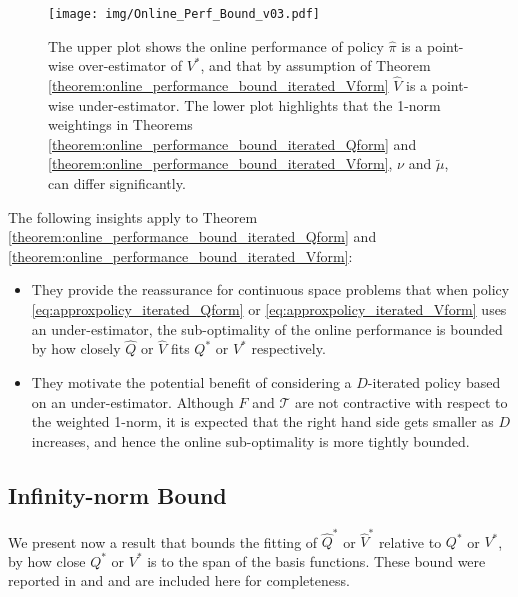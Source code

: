 \documentclass[journal]{IEEEtran}
\newcommand{\mcal}{\mathcal}
\begin{document}
\begin{figure}[t]
	\centering
	\texttt{[image: img/Online\_Perf\_Bound\_v03.pdf]}
	\caption[Visualizing the components of the online performance bound]
	{
		The upper plot shows the online performance of policy $\hat{\pi}$ is a point-wise over-estimator of $V^\ast$, and that by assumption of Theorem \ref{theorem:online_performance_bound_iterated_Vform} $\hat{V}$ is a point-wise under-estimator. The lower plot highlights that the 1-norm weightings in Theorems \ref{theorem:online_performance_bound_iterated_Qform} and \ref{theorem:online_performance_bound_iterated_Vform}, $\nu$ and $\tilde{\mu}$, can differ significantly.
	}
	\label{fig:online_bound_visualisation}
\end{figure}


The following insights apply to Theorem \ref{theorem:online_performance_bound_iterated_Qform} and \ref{theorem:online_performance_bound_iterated_Vform}:
\begin{itemize}
	\item They provide the reassurance for continuous space problems that when policy \eqref{eq:approxpolicy_iterated_Qform} or \eqref{eq:approxpolicy_iterated_Vform} uses an under-estimator, the sub-optimality of the online performance is bounded by how closely $\hat{Q}$ or $\hat{V}$ fits $Q^\ast$ or $V^\ast$ respectively.
	
	\item They motivate the potential benefit of considering a $D$-iterated policy based on an under-estimator. Although $F$ and $\mcal{T}$ are not contractive with respect to the weighted 1-norm, it is expected that the right hand side gets smaller as $D$ increases, and hence the online sub-optimality is more tightly bounded.
\end{itemize}



\vspace{0.2cm}

\subsection{Infinity-norm Bound}  \label{sec:bounds_fitting_infty}


We present now a result that bounds the fitting of $\hat{Q}^\ast$ or $\hat{V}^\ast$ relative to $Q^\ast$ or $V^\ast$, by how close $Q^\ast$ or $V^\ast$ is to the span of the basis functions.
These bound were reported in \cite{beuchat_2016_ECC_PWMQ} and \cite{boyd_iteratedBellman} and are included here for completeness.
\end{document}
